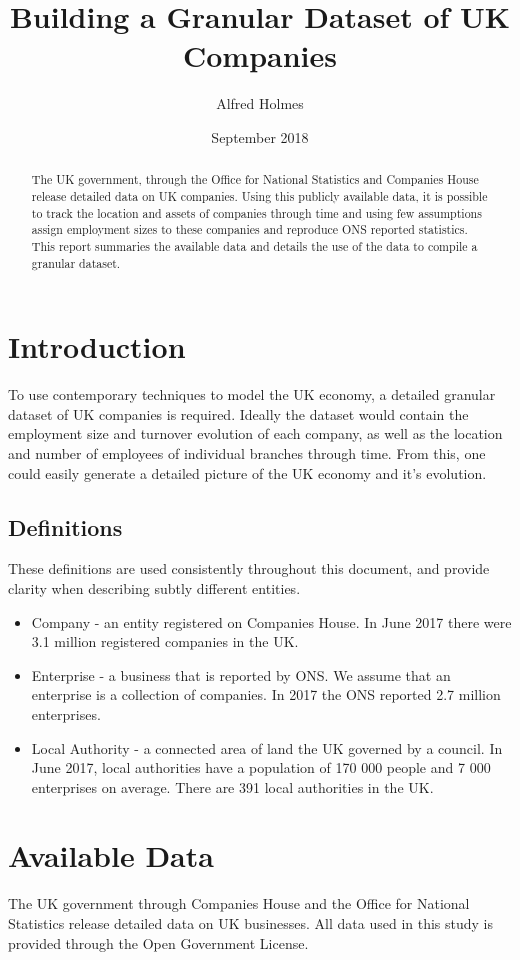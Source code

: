 \documentclass[a4paper,10pt]{article}
\title{Building a Granular Dataset of UK Companies}
\author{Alfred Holmes}
\date{September 2018}
\begin{document}
   \maketitle
   \begin{abstract}
   The UK government, through the Office for National Statistics and Companies House release detailed data on UK companies. Using this publicly available data, it is possible to track the location and assets of companies through time and using few assumptions assign employment sizes to these companies and reproduce ONS reported statistics. This report summaries the available data and details the use of the data to compile a granular dataset.
   \end{abstract}
   \section{Introduction}
   To use contemporary techniques to model the UK economy, a detailed granular dataset of UK companies is required. Ideally the dataset would contain the employment size and turnover evolution of each company, as well as the location and number of employees of individual branches through time. From this, one could easily generate a detailed picture of the UK economy and it's evolution.
   \subsection{Definitions}
   These definitions are used consistently throughout this document, and provide clarity when describing subtly different entities.
   \begin{itemize}
 	\item Company - an entity registered on Companies House. In June 2017 there were 3.1 million registered companies in the UK. 
 	\item Enterprise - a business that is reported by ONS. We assume that an enterprise is a collection of companies. In 2017 the ONS reported 2.7 million enterprises.
 	\item Local Authority - a connected area of land the UK governed by a council. In June 2017, local authorities have a population of 170 000 people and 7 000 enterprises on average. There are 391 local authorities in the UK.
   \end{itemize}

   \section{Available Data}
   The UK government through Companies House and the Office for National Statistics release detailed data on UK businesses. All data used in this study is provided through the Open Government License.
\end{document}
